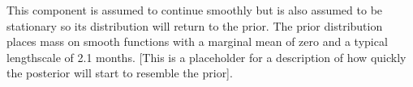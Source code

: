 This component is assumed to continue smoothly but is also assumed to be stationary so its distribution will return to the prior.
The prior distribution places mass on smooth functions with a marginal mean of zero and a typical lengthscale of 2.1 months.
[This is a placeholder for a description of how quickly the posterior will start to resemble the prior].